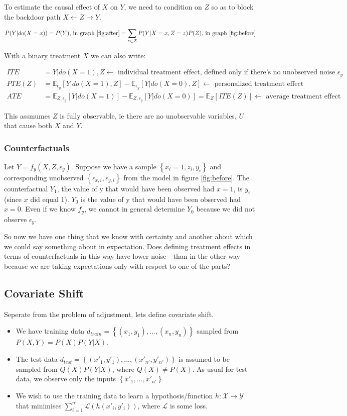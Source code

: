 \documentclass{article}
\newcommand{\E}[2]{\mathbb E_{#1}\left[#2\right]}
\newcommand{\set}[1]{\left\{#1\right\}}
\newcommand{\eq}[1]{\begin{align*}#1\end{align*}}
\theoremstyle{plain}
\theoremstyle{definition}
\begin{document}
To estimate the causal effect of $X$ on $Y$, we need to condition on $Z$ so as to block the backdoor path $X \leftarrow Z \rightarrow Y$. 

\eq {
P(Y|do(X=x))= P(Y) \text{, in graph \ref{fig:after}} = \sum_{z \in \mathcal{Z}}P(Y|X=x,Z=z)P(Z) \text{, in graph \ref{fig:before}}
}

With a binary treatment $X$ we can also write:

\eq{
ITE &= Y|do(X=1),Z \leftarrow \text{ individual treatment effect, defined only if there's no unobserved noise $\epsilon_y$}\\
PTE(Z) &= \E{\epsilon_y}{Y|do(X=1),Z}-\E{\epsilon_y}{Y|do(X=0),Z} \leftarrow \text{ personalized treatment effect}\\
ATE &= \E{Z,\epsilon_y}{Y|do(X=1)} - \E{Z,\epsilon_y}{Y|do(X=0)} = \E{Z}{ITE(Z)} \leftarrow \text{ average treatment effect}
}

This assmumes $Z$ is fully observable, ie there are no unobservable variables, $U$ that cause both $X$ and $Y$. 

\subsubsection*{Counterfactuals}
Let $Y = f_y(X,Z,\epsilon_y)$. Suppose we have a sample $\set{x_i = 1,z_i,y_i}$ and corresponding unobserved $\set{\epsilon_{x,i},\epsilon_{y,i}}$ from the model in figure \ref{fig:before}. The counterfactual $Y_1$, the value of y that would have been observed had $x=1$, is $y_i$ (since $x$ did equal 1). $Y_0$ is the value of y that would have been observed had $x=0$. Even if we know $f_y$, we cannot in general determine $Y_0$ because we did not observe $\epsilon_y$.

So now we have one thing that we know with certainty and another about which we could say something about in expectation. Does defining treatment effects in terms of counterfactuals in this way have lower noise - than in the other way because we are taking expectations only with respect to one of the parts?


\subsection*{Covariate Shift}

Seperate from the problem of adjustment, lets define covariate shift.

\begin{itemize}
\item We have training data $d_{train} = \set{(x_1,y_1),...,(x_n,y_n)}$ sampled from $P(X,Y) = P(X)P(Y|X)$.
\item The test data $d_{test} = \set{(x'_1,y'_1),...,(x'_{n'},y'_{n'})}$ is assumed to be sampled from $Q(X)P(Y|X)$, where $Q(X) \neq P(X)$. As usual for test data, we observe only the inputs $\set{x'_1,...,x'_{n'}}$
\item We wish to use the training data to learn a hypothosis/function $h:\mathcal{X} \rightarrow \mathcal{Y}$ that minimises $\sum_{i = 1}^{n'}\mathcal{L}(h(x'_i,y'_i))$, where $\mathcal{L}$ is some loss.
\end{itemize}
\end{document}
